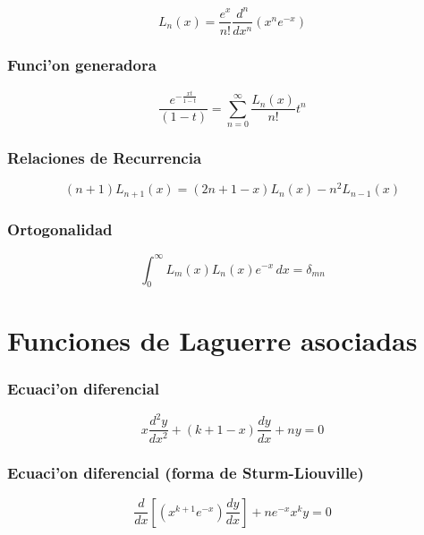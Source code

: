 \begin{equation}
L_{n}(x)=\frac{e^{x}}{n!}\frac{d^{n}}{dx^{n}}(x^{n}e^{-x})
\end{equation}

\subsubsection{Funci'on generadora}

\begin{equation}
\frac{e^{-\frac{xt}{1-t}}}{(1-t)}=\sum_{n=0}^{\infty}\frac{L_{n}(x)}{n!}t^{n}
\end{equation}

\subsubsection{Relaciones de Recurrencia}

\begin{equation}
(n+1)L_{n+1}(x)=(2n+1-x)L_{n}(x)-n^{2}L_{n-1}(x)
\end{equation}

\subsubsection{Ortogonalidad}

\begin{equation}
\int_{0}^{\infty}L_{m}(x)L_{n}(x)e^{-x}\,dx=\delta_{mn}
\end{equation}

\newpage
\section{Funciones de Laguerre asociadas}

\subsubsection{Ecuaci'on diferencial}

\begin{equation}
x\frac{d^{2}y}{dx^{2}}+(k+1-x)\frac{dy}{dx}+ny=0
\end{equation}

\subsubsection{Ecuaci'on diferencial (forma de Sturm-Liouville)}

\begin{equation}
\frac{d}{dx}\left[\left(x^{k+1}e^{-x} \right)\frac{dy}{dx}\right]+ne^{-x}x^{k}y=0
\end{equation}

